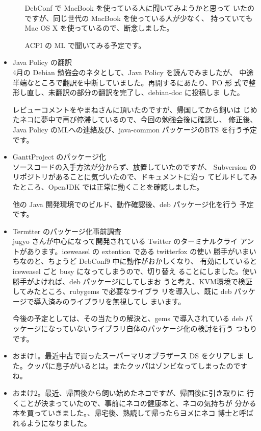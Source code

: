 \documentclass[mingoth,a4paper]{jsarticle}
\begin{document}
\begin{itemize}
\begin{itemize}
	      DebConf で MacBook を使っている人に聞いてみようかと思って
	      いたのですが、同じ世代の MacBook を使っている人が少なく、
	      持っていても Mac OS X を使っているので、断念しました。

	      ACPI の ML で聞いてみる予定です。
       \end{itemize}

 \item Java Policy の翻訳 \\
       4月の Debian 勉強会のネタとして、Java Policy を読んでみましたが、
       中途半端なところで翻訳を中断していました。再開するにあたり、PO 形
       式で整形し直し、未翻訳の部分の翻訳を完了し、debian-doc に投稿しま
       した。

       レビューコメントをやまねさんに頂いたのですが、帰国してから飼いは
       じめたネコに夢中で再び停滞しているので、今回の勉強会後に確認し、
       修正後、Java Policy のMLへの連絡及び、java-common パッケージのBTS
       を行う予定です。

 \item GanttProject のパッケージ化 \\
       ソースコードの入手方法が分からず、放置していたのですが、
       Subversion のリポジトリがあることに気づいたので、ドキュメントに沿っ
       てビルドしてみたところ、OpenJDK では正常に動くことを確認しました。

       他の Java 開発環境でのビルド、動作確認後、deb パッケージ化を行う
       予定です。

 \item Termtter のパッケージ化事前調査 \\
       jugyo さんが中心になって開発されている Twitter のターミナルクライ
       アントがあります。iceweasel の extention である twitterfox の使い
       勝手がいまいちなのと、ちょうど DebConf9 中に動作がおかしくなり、
       有効にしていると iceweasel ごと busy になってしまうので、切り替え
       ることにしました。使い勝手がよければ、deb パッケージにしてしまお
       うと考え、KVM環境で検証してみたところ、rubygems で必要なライブラ
       リを導入し、既に deb パッケージで導入済みのライブラリを無視してし
       まいます。

       今後の予定としては、その当たりの解決と、gems で導入されている deb
       パッケージになっていないライブラリ自体のパッケージ化の検討を行う
       つもりです。

 \item おまけ1。最近中古で買ったスーパーマリオブラザース DS をクリアしま
       した。クッパに息子がいるとは。またクッパはゾンビなってしまったのですね。

 \item おまけ2。最近、帰国後から飼い始めたネコですが、帰国後に引き取りに
       行くことが決まっていたので、事前にネコの健康本と、ネコの気持ちが
       分かる本を買っていきました。、帰宅後、熟読して帰ったらヨメにネコ
       博士と呼ばれるようになりました。
\end{itemize}
\end{document}
